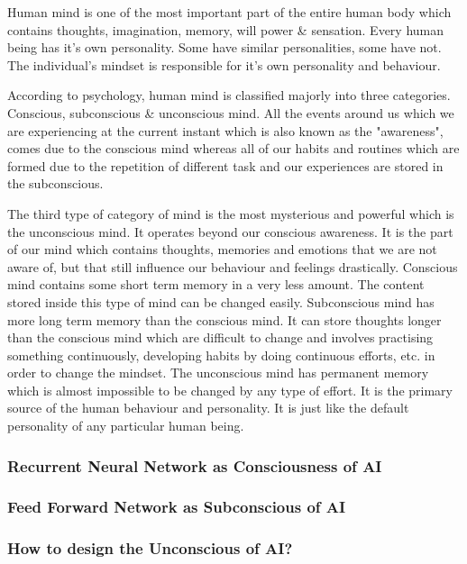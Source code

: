 Human mind is one of the most important part of the entire human body which contains thoughts, imagination, memory, will power \& sensation. Every human being has it's own personality. Some have similar personalities, some have not. The individual's mindset is responsible for it's own personality and behaviour.

According to psychology, human mind is classified majorly into three categories. Conscious, subconscious \& unconscious mind. All the events around us which we are experiencing at the current instant which is also known as the "awareness", comes due to the conscious mind whereas all of our habits and routines which are formed due to the repetition of different task and our experiences are stored in the subconscious. 

The third type of category of mind is the most mysterious and powerful which is the unconscious mind. It operates beyond our conscious awareness. It is the part of our mind which contains thoughts, memories and emotions that we are not aware of, but that still influence our behaviour and feelings drastically. Conscious mind contains some short term memory in a very less amount. The content stored inside this type of mind can be changed easily. Subconscious mind has more long term memory than the conscious mind. It can store thoughts longer than the conscious mind which are difficult to change and involves practising something continuously, developing habits by doing continuous efforts, etc. in order to change the mindset. The unconscious mind has permanent memory which is almost impossible to be changed by any type of effort. It is the primary source of the human behaviour and personality. It is just like the default personality of any particular human being\cite{article}.
\subsubsection{Recurrent Neural Network as Consciousness of AI}
\subsubsection{Feed Forward Network as Subconscious of AI}
\subsubsection{How to design the Unconscious of AI?}
\cite{article}
